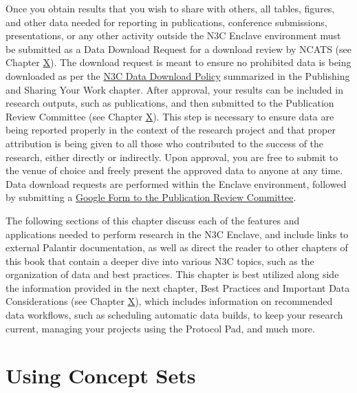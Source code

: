 \documentclass[
  letterpaper,
  DIV=11,
  numbers=noendperiod]{scrreprt}
\begin{document}
Once you obtain results that you wish to share with others, all tables,
figures, and other data needed for reporting in publications, conference
submissions, presentations, or any other activity outside the N3C
Enclave environment must be submitted as a Data Download Request for a
download review by NCATS (see Chapter
\protect\hyperlink{Publishing-and-Sharing-Your-Work}{X}). The download
request is meant to ensure no prohibited data is being downloaded as per
the \href{https://covid.cd2h.org/download}{N3C Data Download Policy}
summarized in the Publishing and Sharing Your Work chapter. After
approval, your results can be included in research outputs, such as
publications, and then submitted to the Publication Review Committee
(see Chapter \protect\hyperlink{Publishing-and-Sharing-Your-Work}{X}).
This step is necessary to ensure data are being reported properly in the
context of the research project and that proper attribution is being
given to all those who contributed to the success of the research,
either directly or indirectly. Upon approval, you are free to submit to
the venue of choice and freely present the approved data to anyone at
any time. Data download requests are performed within the Enclave
environment, followed by submitting a
\href{https://www.google.com/url?q=https://docs.google.com/forms/d/e/1FAIpQLSe8cezMX5KMXyo8DRb9qmgr95rAPEKcvIWIdZv72rIUxlcpIA/viewform\&sa=D\&source=docs\&ust=1677168810532504\&usg=AOvVaw12T-1ZD5cVj92DGadpr1IN}{Google
Form to the Publication Review Committee}.

The following sections of this chapter discuss each of the features and
applications needed to perform research in the N3C Enclave, and include
links to external Palantir documentation, as well as direct the reader
to other chapters of this book that contain a deeper dive into various
N3C topics, such as the organization of data and best practices. This
chapter is best utilized along side the information provided in the next
chapter, Best Practices and Important Data Considerations (see Chapter
\protect\hyperlink{Best-Practices-and-Important-Data-Considerations}{X}),
which includes information on recommended data workflows, such as
scheduling automatic data builds, to keep your research current,
managing your projects using the Protocol Pad, and much more.

\hypertarget{using-concept-sets}{%
\section{Using Concept Sets}\label{using-concept-sets}}
\end{document}
